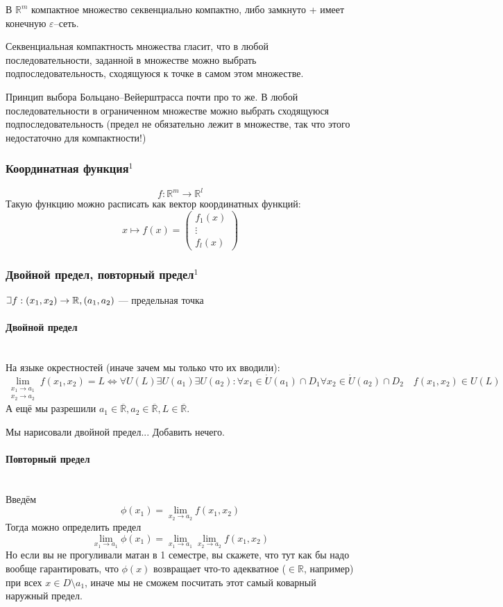 \documentclass{article}
\def\letus{%
\mathord{\setbox0=\hbox{$\exists$}%
         \hbox{\kern 0.125\wd0%
               \vbox to \ht0{%
                  \hrule width 0.75\wd0%
                  \vfill%
                  \hrule width 0.75\wd0}%
               \vrule height \ht0%
               \kern 0.125\wd0}%
       }%
        }
\let\vanillaparagraph\paragraph
\renewcommand{\paragraph}[1]{\vanillaparagraph{#1}\mbox{}\\}
\begin{document}
В $\mathbb{R}^m$ компактное множество секвенциально компактно, либо замкнуто + имеет конечную $\varepsilon$--сеть.

Секвенциальная компактность множества гласит, что в любой последовательности, заданной в множестве можно выбрать подпоследовательность, сходящуюся к точке в самом этом множестве.

Принцип выбора Больцано--Вейерштрасса почти про то же. В любой последовательности в ограниченном множестве можно выбрать сходящуюся подпоследовательность (предел не обязательно лежит в множестве, так что этого недостаточно для компактности!)

\subsubsection{Координатная функция\texorpdfstring{$^1$}{}}
$$
f: \mathbb{R}^m \rightarrow \mathbb{R}^l
$$
Такую функцию можно расписать как вектор координатных функций:
$$
x \mapsto f(x) = \left(\begin{array}{c}
     f_1(x) \\
     \vdots \\
     f_l(x)
\end{array} \right)
$$

\subsubsection{Двойной предел, повторный предел\texorpdfstring{$^1$}{}}
$\letus f: (x_1, x_2) \rightarrow \mathbb{R}, (a_1, a_2)$ --- предельная точка

\paragraph{Двойной предел}
На языке окрестностей (иначе зачем мы только что их вводили):
$$
\lim_{\begin{array}{c} x_1\rightarrow a_1 \\ x_2 \rightarrow a_2 \end{array}} f(x_1, x_2) = L \Leftrightarrow \forall U(L) \exists U(a_1) \exists U(a_2) : \forall x_1 \in \dot{U}(a_1) \cap D_1 \forall x_2 \in \dot{U}(a_2) \cap D_2 \quad f(x_1, x_2) \in U(L) 
$$
А ещё мы разрешили $a_1 \in \overline{\mathbb{R}}, a_2 \in \overline{\mathbb{R}}, L \in \overline{\mathbb{R}}$.

Мы нарисовали двойной предел... Добавить нечего.

\paragraph{Повторный предел}
Введём 
$$\phi(x_1) = \lim_{x_2 \rightarrow a_2} f(x_1, x_2)$$
Тогда можно определить предел
$$
\lim_{x_1\rightarrow a_1} \phi(x_1) = \lim_{x_1\rightarrow a_1} \lim_{x_2 \rightarrow a_2} f(x_1, x_2)
$$
Но если вы не прогуливали матан в 1 семестре, вы скажете, что тут как бы надо вообще гарантировать, что $\phi(x)$ возвращает что-то адекватное ($\in \mathbb{R}$, например) при всех $x \in D \setminus a_1$, иначе мы не сможем посчитать этот самый коварный наружный предел.
\end{document}
